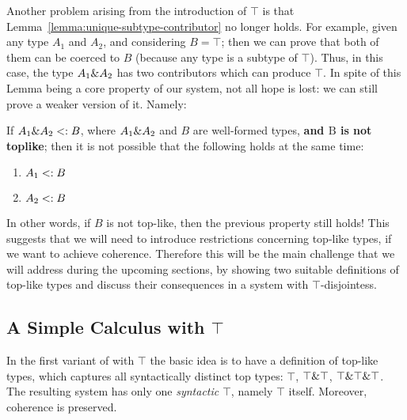 Another problem arising from the introduction of $\top$ is that Lemma~\ref{lemma:unique-subtype-contributor}
no longer holds.
For example, given any type $A_1$ and $A_2$, and considering $B = \top$; then we can prove that both of 
them can be coerced to $B$ (because any type is a subtype of $\top$).
Thus, in this case, the type ${A_1} \& {A_2}$ has two contributors which can produce $\top$.
In spite of this Lemma being a core property of our system, not all hope is lost:
we can still prove a weaker version of it.
Namely:

\begin{lemma}
  \label{lemma:unique-subtype-contributor-with-top}

  If $A_1 \& A_2 <: B$, where $A_1 \& A_2$ and $B$ are well-formed types,
  \textbf{and $\text{B}$ is not toplike};
  then it is not possible that the following holds at the same time:
  \begin{enumerate}
    \item $A_1 <: B$
    \item $A_2 <: B$
  \end{enumerate}
\end{lemma}

In other words, if $B$ is not top-like, then the previous property still holds!
This suggests that we will need to introduce restrictions concerning top-like types, if we want to achieve
coherence.
Therefore this will be the main challenge that we will address during the upcoming sections,
by showing two suitable definitions of top-like types and discuss  
their consequences in a system with $\top$-disjointess.

\subsection{A Simple Calculus with $\top$}\label{subsec:simpletop}

In the first variant of \name with $\top$ the basic idea is to have a 
definition of top-like types, which captures all syntactically
distinct top types:  $\top$, $\top \& \top$, $\top \& \top
\& \top$. The resulting system has only one \emph{syntactic}
$\top$, namely $\top$ itself. Moreover, coherence is preserved.


